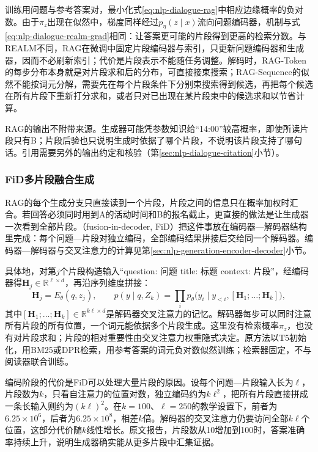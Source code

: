 训练用问题与参考答案对，最小化式\eqref{eq:nlp-dialogue-rag}中相应边缘概率的负对数。由于$\pi_z$出现在似然中，梯度同样经过$p_\eta(z\mid x)$流向问题编码器，机制与式\eqref{eq:nlp-dialogue-realm-grad}相同：让答案更可能的片段得到更高的检索分数。与REALM不同，RAG在微调中固定片段编码器与索引，只更新问题编码器和生成器，因而不必刷新索引；代价是片段表示不能随任务调整。解码时，RAG-Token的每步分布本身就是对片段求和后的分布，可直接接束搜索；RAG-Sequence的似然不能按词元分解，需要先在每个片段条件下分别束搜索得到候选，再把每个候选在所有片段下重新打分求和，或者只对已出现在某片段束中的候选求和以节省计算。

RAG的输出不附带来源。生成器可能凭参数知识给“14:00”较高概率，即使所读片段只有B；片段后验也只说明生成时依据了哪个片段，不说明该片段支持了哪句话。引用需要另外的输出约定和核验（第\ref{sec:nlp-dialogue-citation}小节）。

\subsubsection{FiD多片段融合生成}
\label{sec:nlp-dialogue-fid}

RAG的每个生成分支只直接读到一个片段，片段之间的信息只在概率加权时汇合。若回答必须同时用到A的活动时间和B的报名截止，更直接的做法是让生成器一次看到全部片段。（fusion-in-decoder, FiD）把这件事放在编码器—解码器结构里完成：每个问题—片段对独立编码，全部编码结果拼接后交给同一个解码器。编码器—解码器与交叉注意力的计算见第\ref{sec:nlp-generation-encoder-decoder}小节。

具体地，对第$j$个片段构造输入“question: 问题 title: 标题 context: 片段”，经编码器得$\bm H_j\in\mathbb R^{\ell\times d}$，再沿序列维度拼接：
\begin{equation}
 \bm H_j=E_\theta(q,z_j),\qquad
 p(y\mid q,Z_k)=
 \prod_i p_\theta\bigl(y_i\mid y_{<i},[\bm H_1;\ldots;\bm H_k]\bigr),
 \label{eq:nlp-dialogue-fid}
\end{equation}
其中$[\bm H_1;\ldots;\bm H_k]\in\mathbb R^{k\ell\times d}$是解码器交叉注意力的记忆。解码器每步可以同时注意所有片段的所有位置，一个词元能依据多个片段生成。这里没有检索概率$\pi_z$，也没有对片段求和；片段的相对重要性由交叉注意力权重隐式决定。原方法以T5初始化，用BM25或DPR检索，用参考答案的词元负对数似然训练；检索器固定，不与阅读器联合训练。

编码阶段的代价是FiD可以处理大量片段的原因。设每个问题—片段输入长为$\ell$，片段数为$k$，只看自注意力的位置对数，独立编码约为$k\ell^2$，把所有片段直接拼成一条长输入则约为$(k\ell)^2$。在$k=100$、$\ell=250$的教学设置下，前者为$6.25\times10^{6}$，后者为$6.25\times10^{8}$，相差$k$倍。解码器的交叉注意力仍要访问全部$k\ell$个位置，这部分代价随$k$线性增长。原文报告，片段数从10增加到100时，答案准确率持续上升，说明生成器确实能从更多片段中汇集证据。

